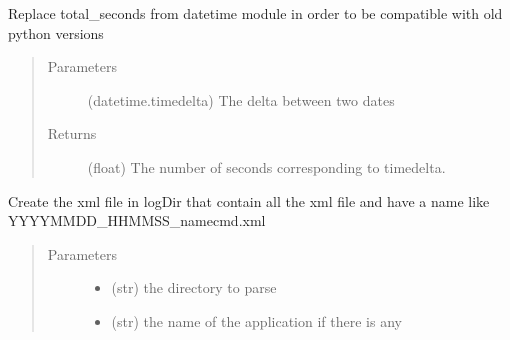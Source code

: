 \documentclass[a4paper,10pt,english]{sphinxmanual}
\begin{document}
\begin{fulllineitems}
\label{\detokenize{apidoc_src/src:src.utilsSat.timedelta_total_seconds}}
Replace total\_seconds from datetime module 
in order to be compatible with old python versions
\begin{quote}\begin{description}
\item[{Parameters}] \leavevmode
{} \textendash{} (datetime.timedelta) 
The delta between two dates

\item[{Returns}] \leavevmode
(float) 
The number of seconds corresponding to timedelta.

\end{description}\end{quote}

\end{fulllineitems}


\begin{fulllineitems}
\label{\detokenize{apidoc_src/src:src.utilsSat.update_hat_xml}}
Create the xml file in logDir that contain all the xml file 
and have a name like YYYYMMDD\_HHMMSS\_namecmd.xml
\begin{quote}\begin{description}
\item[{Parameters}] \leavevmode\begin{itemize}
\item {} 
 \textendash{} (str) the directory to parse

\item {} 
 \textendash{} (str) the name of the application if there is any

\end{itemize}

\end{description}\end{quote}

\end{fulllineitems}
\end{document}
